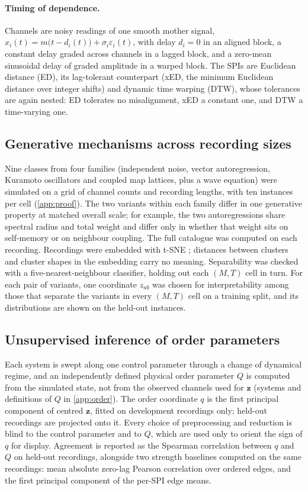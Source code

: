 \paragraph{Timing of dependence.} Channels are noisy readings of one smooth mother signal, $x_i(t) = m\big(t - d_i(t)\big) + \sigma_i \varepsilon_i(t)$, with delay $d_i = 0$ in an aligned block, a constant delay graded across channels in a lagged block, and a zero-mean sinusoidal delay of graded amplitude in a warped block. The SPIs are Euclidean distance (ED), its lag-tolerant counterpart (xED, the minimum Euclidean distance over integer shifts) and dynamic time warping (DTW), whose tolerances are again nested: ED tolerates no misalignment, xED a constant one, and DTW a time-varying one.

\subsection{Generative mechanisms across recording sizes}
\label{sec:methods-proof}
Nine classes from four families (independent noise, vector autoregression, Kuramoto oscillators and coupled map lattices, plus a wave equation) were simulated on a grid of channel counts and recording lengths, with ten instances per cell (\cref{app:proof}). The two variants within each family differ in one generative property at matched overall scale; for example, the two autoregressions share spectral radius and total weight and differ only in whether that weight sits on self-memory or on neighbour coupling. The full catalogue was computed on each recording. Recordings were embedded with t-SNE ; distances between clusters and cluster shapes in the embedding carry no meaning. Separability was checked with a five-nearest-neighbour classifier, holding out each $(M,T)$ cell in turn. For each pair of variants, one coordinate $z_{ab}$ was chosen for interpretability among those that separate the variants in every $(M,T)$ cell on a training split, and its distributions are shown on the held-out instances.

\subsection{Unsupervised inference of order parameters}
\label{sec:methods-order}
Each system is swept along one control parameter through a change of dynamical regime, and an independently defined physical order parameter $Q$ is computed from the simulated state, not from the observed channels used for $\mathbf{z}$ (systems and definitions of $Q$ in \cref{app:order}). The order coordinate $q$ is the first principal component of centred $\mathbf{z}$, fitted on development recordings only; held-out recordings are projected onto it. Every choice of preprocessing and reduction is blind to the control parameter and to $Q$, which are used only to orient the sign of $q$ for display. Agreement is reported as the Spearman correlation between $q$ and $Q$ on held-out recordings, alongside two strength baselines computed on the same recordings: mean absolute zero-lag Pearson correlation over ordered edges, and the first principal component of the per-SPI edge means.

